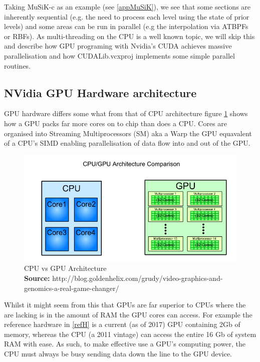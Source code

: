 \documentclass[a4paper]{amsart}
\newcommand*{\captionsource}[2]{%
  \caption[{#1}]{%
    #1%
    \\\hspace{\linewidth}%
    \textbf{Source:} #2%
  }%
}
\begin{document}
Taking MuSiK-c as an example (see \ref{appMuSiK}), we see that some sections are inherently sequential (e.g. the need to process each level using the state of prior levels) and some areas can be run in parallel (e.g the interpolation via ATBPFs or RBFs). As multi-threading on the CPU is a well known topic, we will skip this and describe how GPU programing with Nvidia's CUDA achieves massive parallelisation and how CUDALib.vcxproj implements some simple parallel routines.

\subsection {NVidia GPU Hardware architecture}

GPU hardware differs some what from that of CPU architecture figure \ref{fig:CPUGPU} shows how a GPU packs far more cores on to chip than does a CPU. Cores are organised into Streaming Multiprocessors (SM) aka a Warp the GPU equavalent of a CPU's SIMD enabling parallelisation of data flow into and out of the GPU.

\begin{figure}[h]
\centering
\includegraphics[scale=0.5]{cpu_vs_gpu-1.png}
\captionsource{CPU vs GPU Architecture}{ http://blog.goldenhelix.com/grudy/video-graphics-and-genomics-a-real-game-changer/}
\label {fig:CPUGPU}
\end{figure}

Whilst it might seem from this that GPUs are far superior to CPUs where the are lacking is in the amount of RAM the GPU cores can access. For example the reference hardware in \ref{refH} is a current (as of 2017) GPU containing 2Gb of memory, whereas the CPU (a 2011 vintage) can access the entire 16 Gb of system RAM with ease. As such, to make effective use a GPU's computing power, the CPU must always be busy sending data down the line to the GPU device.
\end{document}
